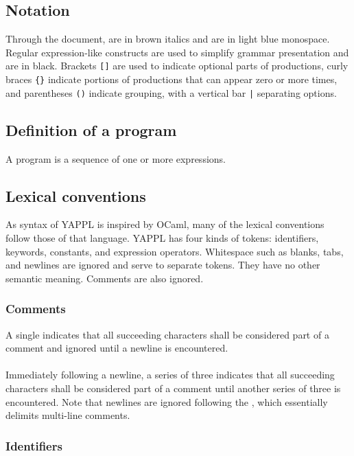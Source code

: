 
\subsection{Notation}

Through the document,  are in brown italics and  are in light blue monospace. Regular expression-like constructs are used to simplify grammar presentation and are in black. Brackets \texttt{[]} are used to indicate optional parts of productions, curly braces \texttt{\{\}} indicate portions of productions that can appear zero or more times, and parentheses \texttt{()} indicate grouping, with a vertical bar \texttt{|} separating options. 

\subsection{Definition of a program}

A program is a sequence of one or more expressions.

\subsection{Lexical conventions}

As syntax of YAPPL is inspired by OCaml, many of the lexical conventions follow those of that language. YAPPL has four kinds of tokens: identifiers, keywords, constants, and expression operators. Whitespace such as blanks, tabs, and newlines are ignored and serve to separate tokens. They have no other semantic meaning. Comments are also ignored.

\subsubsection{Comments}

A single \term{\#} indicates that all succeeding characters shall be considered part of a comment and ignored until a newline is encountered. \\
\\
Immediately following a newline, a series of three \term{\#\#\#} indicates that all succeeding characters shall be considered part of a comment until another series of three \term{\#\#\#} is encountered. Note that newlines are ignored following the \term{\#\#\#}, which essentially delimits multi-line comments.

\subsubsection{Identifiers}

